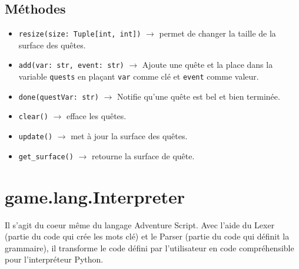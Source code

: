 \documentclass{report}
\begin{document}
\subsection*{Méthodes}
\begin{itemize}
  \item \texttt{resize(size: Tuple[int, int])} $\rightarrow$ permet de changer la taille de la surface des quêtes.
  \item \texttt{add(var: str, event: str)} $\rightarrow$ Ajoute une quête et la place dans la variable \texttt{quests} en plaçant \texttt{var} comme clé et \texttt{event} comme valeur.
  \item \texttt{done(questVar: str)} $\rightarrow$ Notifie qu'une quête est bel et bien terminée.
  \item \texttt{clear()} $\rightarrow$ efface les quêtes.
  \item \texttt{update()} $\rightarrow$ met à jour la surface des quêtes.
  \item \texttt{get_surface()} $\rightarrow$ retourne la surface de quête.
 \end{itemize}
\newpage
\section{game.lang.Interpreter}
Il s'agit du coeur même du langage Adventure Script. Avec l'aide du Lexer (partie du code qui crée les mots clé) et le Parser (partie du code qui définit la grammaire), il transforme le code défini par l'utilisateur en code compréhensible pour l'interpréteur Python.
\end{document}

